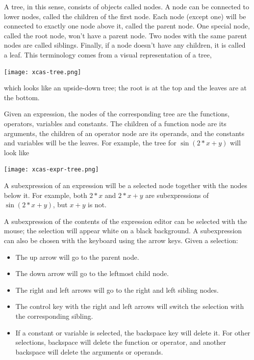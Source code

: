 \documentclass[a4paper,11pt]{book}
\begin{document}
A tree, in this sense, consists of objects
called nodes.  A node can be connected to lower nodes, called the
children of the first node. Each node (except one) will be connected
to exactly one node above it, called the parent node.  One special
node, called the root node, won't have a parent node.  Two nodes with
the same parent nodes are called siblings.  Finally, if a node doesn't
have any children, it is called a leaf.  This terminology comes from a
visual representation of a tree,
\begin{center}
  \texttt{[image: xcas-tree.png]}
\end{center}
which looks like an upside-down tree; the root is at the
top and the leaves are at the bottom. 

Given an expression, the nodes of the corresponding
tree are the functions, operators, variables
and constants.  The children of a function node are its arguments, the
children of an operator node are its operands, and the constants and
variables will be the leaves.  For example, the tree for $\sin(2*x +
y)$ will look like
\begin{center}
  \texttt{[image: xcas-expr-tree.png]}
\end{center}
A subexpression of an expression will be a
selected node together with the nodes below it.  For example, both
$2*x$ and $2*x+y$ are subexpressions of $\sin(2*x+y)$, but $x+y$ is
not.

A subexpression of the contents of the expression editor can be
selected with the mouse; the selection will appear white on a black
background.  A subexpression can also be chosen with the keyboard
using the arrow keys.  Given a selection:
\begin{itemize}
  \item
  The up arrow will go to the parent node.
  \item
  The down arrow will go to the leftmost child node.
  \item
  The right and left arrows will go to the right and left sibling nodes.
  \item
  The control key with the right and left arrows will switch the
  selection with the corresponding sibling.
  \item
  If a constant or variable is selected, the backspace key will delete
  it.  For other selections, backspace will delete the function or
  operator, and another backspace will delete the arguments or operands.
\end{itemize}
\end{document}
